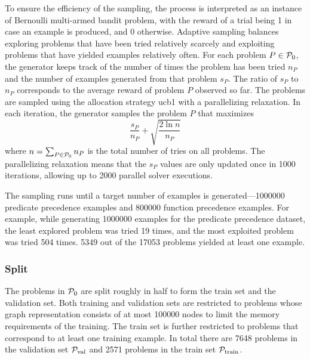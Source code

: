 To ensure the efficiency of the sampling, the process is interpreted as an instance of Bernoulli multi-armed bandit problem,
with the reward of a trial being 1 in case an example is produced, and 0 otherwise.
Adaptive sampling balances
exploring problems that have been tried relatively scarcely and
exploiting problems that have yielded examples relatively often.
For each problem $P \in \operatorname{\mathcal{P}_{0}}$,
the generator keeps track of the number of times the problem has been tried $n_P$
and the number of examples generated from that problem $s_P$.
The ratio of $s_P$ to $n_P$ corresponds to the average reward of problem $P$ observed so far.
The problems are sampled using the allocation strategy \acrshort{ucb1} \cite{Auer2002} with a parallelizing relaxation.
In each iteration, the generator samples the problem $P$ that maximizes
$$
\frac{s_P}{n_P} + \sqrt{\frac{2 \ln n}{n_P}}
$$
where $n = \sum_{P \in \operatorname{\mathcal{P}_{0}}} n_P$ is the total number of tries on all problems.
The parallelizing relaxation means that the $s_P$ values are only updated once in \num{1000} iterations,
allowing up to \num{2000} parallel solver executions.

The sampling runs until a target number of examples is generated---\num{1000000} predicate precedence examples and \num{800000} function precedence examples.
For example, while generating \num{1000000} examples for the predicate precedence dataset,
the least explored problem was tried 19 times, and the most exploited problem was tried 504 times.
\num{5349} out of the \num{17053} problems yielded at least one example.

\subsubsection{Split}

The problems in $\operatorname{\mathcal{P}_{0}}$ are split roughly in half to form the train set and the validation set.
Both training and validation sets are restricted to problems whose graph representation consists of at most \num{100000} nodes
to limit the memory requirements of the training.
The train set is further restricted to problems that correspond to at least one training example.
In total there are \num{7648} problems in the validation set $\operatorname{\mathcal{P}_{\mathrm{val}}}$
and \num{2571} problems in the train set $\operatorname{\mathcal{P}_{\mathrm{train}}}$.

